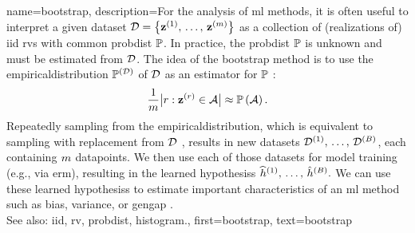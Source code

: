 {name={bootstrap},
	description={For the analysis of \gls{ml} methods, it is often 
	    	useful to interpret a given \gls{dataset} $\mathcal{D} = \big\{ {\bf z}^{(1)}, \,\ldots, \,{\bf z}^{(m)}\big\}$ 
		as a collection of (\glspl{realization} of) \gls{iid} \glspl{rv} with 
		common \gls{probdist} $\mathbb{P}$. In practice, the \gls{probdist} $\mathbb{P}$ 
		is unknown and must be estimated from $\mathcal{D}$. The idea of the bootstrap 
		method is to use the \gls{empiricaldistribution} $\mathbb{P}^{(\mathcal{D})}$ 
		of $\mathcal{D}$ as an \gls{estimator} for $\mathbb{P}$ \cite{hastie01statisticallearning}:
		$$ \frac{1}{m} \big| r: {\bf z}^{(r)} \in \mathcal{A} \big| \approx \mathbb{P}\left(\mathcal{A}\right).$$
		Repeatedly sampling from the \gls{empiricaldistribution}, which is equivalent 
		to sampling with replacement from $\mathcal{D}$ \cite{BoostrapBook}, 
		results in new \glspl{dataset} $\mathcal{D}^{(1)}, \,\ldots, \,\mathcal{D}^{(B)}$, each containing 
		$m$ \glspl{datapoint}. We then use each of 
		those \glspl{dataset} for \gls{model} \gls{training} (e.g., via \gls{erm}), 
		resulting in the learned \glspl{hypothesis}
		$\widehat{h}^{(1)}, \,\ldots, \,\hat{h}^{(B)}.$ 
        		We can use these learned \glspl{hypothesis} to estimate important characteristics 
		of an \gls{ml} method such as \gls{bias}, \gls{variance}, or \gls{gengap} \cite{hastie01statisticallearning}.
		\\
		See also: \gls{iid}, \gls{rv}, \gls{probdist}, \gls{histogram}.},
	first={bootstrap},
	text={bootstrap}  
}

